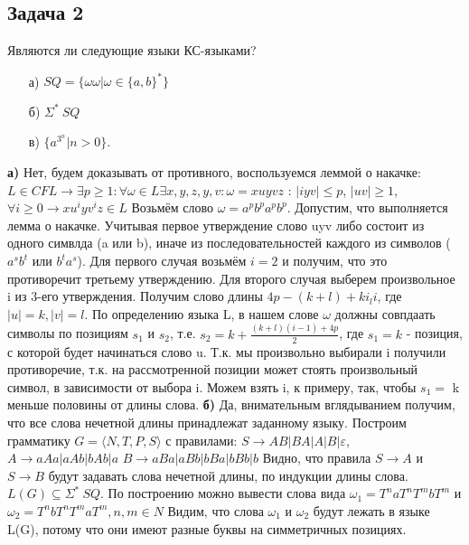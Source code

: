 \documentclass[a4paper,14pt]{article} %
\begin{document}
\subsection{Задача 2}
Являются ли следующие языки КС-языками?
\begin{itemize}
    \item[а)] $SQ = \{ \omega \omega | \omega \in \{a, b\}^*\}$
    \item[б)] $\Sigma^* \ SQ$
    \item[в)] $\{ a^{3^n} | n > 0 \}$.
\end{itemize}
\textbf{а)} Нет, будем доказывать от противного, воспользуемся леммой о накачке:
$L \in CFL \longrightarrow \exists p \geqslant 1 : \forall \omega \in L \exists x, y, z, y, v : \omega = xuyvz$ : $|iyv| \leqslant p$, $|uv| \geqslant 1$, $\forall i \geqslant 0 \rightarrow xu^iyv^iz \in L$
\newline
Возьмём слово $\omega = a^pb^pa^pb^p$. Допустим, что выполняется лемма о накачке. Учитывая первое утверждение слово uyv либо состоит из одного симвлда (a или b), иначе из последовательностей каждого из символов ($a^sb^t$ или $b^ta^s$). Для первого случая возьмём $i = 2$ и получим, что это противоречит третьему утверждению.
Для второго случая выберем произвольное i из 3-его утверждения. Получим слово длины $4p - (k+l) + ki _ li$, где $|u| = k, |v| = l$. По определению языка L, в нашем слове $\omega$ должны совпдаать символы по позициям $s_1$ и $s_2$, т.е. $s_2 = k + \frac{(k+l)(i-1) + 4p}{2}$, где $s_1 = k$ - позиция, с которой будет начинаться слово u. Т.к. мы произвольно выбирали i получили противоречие, т.к. на рассмотренной позиции может стоять произвольный символ, в зависимости от выбора i. Можем взять i, к примеру, так, чтобы $s_1 =$ k меньше половины от длины слова.
\newline
\textbf{б)} Да, внимательным вглядыванием получим, что все слова нечетной длины принадлежат заданному языку. Построим грамматику $G = \langle N, T, P, S \rangle$ с правилами:
\newline
$S \longrightarrow AB | BA | A | B | \varepsilon$,
\newline
$A \longrightarrow aAa|aAb|bAb|a$
\newline
$B \longrightarrow aBa|aBb|bBa|bBb|b$
Видно, что правила $S \longrightarrow A$ и $S \longrightarrow B$ будут задавать слова нечетной длины, по индукции длины слова.
$L(G) \subseteq \Sigma^* \ SQ$. По построению можно вывести слова вида $\omega_1 = T^naT^nT^mbT^m$ и $\omega_2 = T^nbT^nT^maT^m, n, m \in N$
Видим, что слова $\omega_1$ и $\omega_2$ будут лежать в языке L(G), потому что они имеют разные буквы на симметричных позициях.
\end{document}
